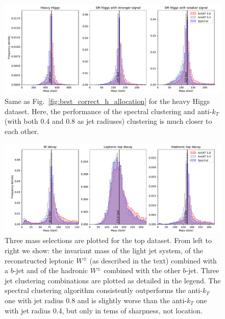 \begin{figure}[htp]
    \includegraphics[width=1.\textwidth]{graphics/mass_peaks/heavy_long_correct_lines}
    \caption{Same as Fig.~\ref{fig:best_correct_h_allocation} for the heavy Higgs dataset. Here, the performance of the spectral clustering and anti-$k_T$ (with both 0.4 and 0.8 as jet radiuses) clustering is much closer to each other. 
}\label{fig:heavy_correct_mass_peaks}
\end{figure}    


\begin{figure}[htp]
    \includegraphics[width=1.\textwidth]{graphics/mass_peaks/top_long_correct_lines}
    \caption{Three mass selections are plotted for the top dataset. From left to right we show: the invariant mass of the light jet system, of the reconstructed leptonic $W^\pm$ (as  described in the text) combined with a $b$-jet and of the hadronic $W^\pm$ combined with the other $b$-jet. Three jet clustering combinations are plotted as detailed in the legend.
The spectral clustering algorithm  consistently outperforms the  anti-$k_T$ one with jet radius 0.8 and is slightly worse than the anti-$k_T$ one with jet radius 0.4, but only in tems of sharpness, not location.
    }\label{fig:top_correct_mass_peaks}
\end{figure}    

